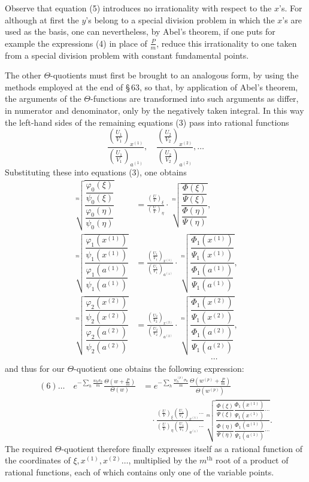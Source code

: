 \documentclass[10pt]{article}
\begin{document}
Observe that equation (5) introduces no irrationality with respect to the \(x\)'s. For although at first the \(y\)'s belong to a special division problem in which the \(x\)'s are used as the basis, one can nevertheless, by Abel's theorem, if one puts for example the expressions (4) in place of \(\frac Pm\), reduce this irrationality to one taken from a special division problem with constant fundamental points.

The other \(\Theta\)-quotients must first be brought to an analogous form, by using the methods employed at the end of \S\,63, so that, by application of Abel's theorem, the arguments of the \(\Theta\)-functions are transformed into such arguments as differ, in numerator and denominator, only by the negatively taken integral. In this way the left-hand sides of the remaining equations (3) pass into rational functions
\[
\frac{\left(\frac{U_1}{V_1}\right)_{x^{(1)}}}{\left(\frac{U_1}{V_1}\right)_{a^{(1)}}},\quad
\frac{\left(\frac{U_2}{V_2}\right)_{x^{(2)}}}{\left(\frac{U_2}{V_2}\right)_{a^{(2)}}},\ldots
\]
Substituting these into equations (3), one obtains
\[
\begin{aligned}
\sqrt[m]{\dfrac{\dfrac{\varphi_0(\xi)}{\psi_0(\xi)}}{\dfrac{\varphi_0(\eta)}{\psi_0(\eta)}}}
&=
\frac{\left(\frac{U}{V}\right)_\xi}{\left(\frac{U}{V}\right)_\eta}
\cdot
\sqrt[m]{\dfrac{\dfrac{\Phi(\xi)}{\Psi(\xi)}}{\dfrac{\Phi(\eta)}{\Psi(\eta)}}},\\
\sqrt[m]{\dfrac{\dfrac{\varphi_1(x^{(1)})}{\psi_1(x^{(1)})}}{\dfrac{\varphi_1(a^{(1)})}{\psi_1(a^{(1)})}}}
&=
\frac{\left(\frac{U_1}{V_1}\right)_{x^{(1)}}}{\left(\frac{U_1}{V_1}\right)_{a^{(1)}}}
\cdot
\sqrt[m]{\dfrac{\dfrac{\Phi_1(x^{(1)})}{\Psi_1(x^{(1)})}}{\dfrac{\Phi_1(a^{(1)})}{\Psi_1(a^{(1)})}}},\\
\sqrt[m]{\dfrac{\dfrac{\varphi_2(x^{(2)})}{\psi_2(x^{(2)})}}{\dfrac{\varphi_2(a^{(2)})}{\psi_2(a^{(2)})}}}
&=
\frac{\left(\frac{U_2}{V_2}\right)_{x^{(2)}}}{\left(\frac{U_2}{V_2}\right)_{a^{(2)}}}
\cdot
\sqrt[m]{\dfrac{\dfrac{\Phi_1(x^{(2)})}{\Psi_1(x^{(2)})}}{\dfrac{\Phi_1(a^{(2)})}{\Psi_1(a^{(2)})}}},\\
&\hspace{9em}\cdots
\end{aligned}
\]
and thus for our \(\Theta\)-quotient one obtains the following expression:
\[
\begin{aligned}
(6)\ldots\quad
e^{-\sum_h\frac{w_h\sigma_h}{m}}
\frac{\Theta\left(w+\frac Pm\right)}{\Theta(w)}
&=
e^{-\sum_h\frac{w_h^{(p)}\sigma_h}{m}}
\frac{\Theta\left(w^{(p)}+\frac Pm\right)}{\Theta(w^{(p)})}\\
&\quad{}\cdot
\frac{\left(\frac UV\right)_\xi\left(\frac{U_1}{V_1}\right)_{x^{(1)}}\cdots}
     {\left(\frac UV\right)_\eta\left(\frac{U_1}{V_1}\right)_{a^{(1)}}\cdots}
\sqrt[m]{\frac{
\dfrac{\Phi(\xi)}{\Psi(\xi)}\dfrac{\Phi_1(x^{(1)})}{\Psi_1(x^{(1)})}\cdots
}{
\dfrac{\Phi(\eta)}{\Psi(\eta)}\dfrac{\Phi_1(a^{(1)})}{\Psi_1(a^{(1)})}\cdots
}}.
\end{aligned}
\]
The required \(\Theta\)-quotient therefore finally expresses itself as a rational function of the coordinates of \(\xi,x^{(1)},x^{(2)}\ldots\), multiplied by the \(m^{\text{th}}\) root of a product of rational functions, each of which contains only one of the variable points.
\end{document}
